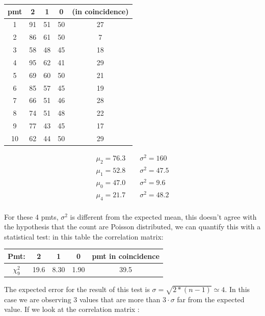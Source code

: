 \begin{center}
\begin{tabular}{c|c|c|c|c}
\hline 
pmt & 2 & 1 & 0 & (in coincidence) \\ 
\hline 
1 & 91 & 51 & 50 & 27 \\ 
\hline 
2 & 86 & 61 & 50 & 7 \\ 
\hline 
3 & 58 & 48 & 45 & 18 \\ 
\hline 
4 & 95 & 62 & 41 & 29 \\ 
\hline 
5 & 69 & 60 & 50 & 21 \\ 
\hline 
6 & 85 & 57 & 45 & 19 \\ 
\hline 
7 & 66 & 51 & 46 & 28 \\ 
\hline 
8 & 74 & 51 & 48 & 22 \\ 
\hline 
9 & 77 & 43 & 45 & 17 \\ 
\hline 
10 & 62 & 44 & 50 & 29 \\ 
\hline 
\end{tabular} 
\end{center}

\begin{equation*}
\begin{split}
\mu_{2} = 76.3 \qquad \sigma^{2} = 160  \\
\mu_{1} = 52.8 \qquad \sigma^{2} = 47.5 \\
\mu_{0} = 47.0 \qquad \sigma^{2} = 9.6  \\
\mu_{4} = 21.7 \qquad \sigma^{2} = 48.2 \\
\end{split}
\end{equation*}

For these 4 pmts, $\sigma^{2}$ is different from the expected mean, this doesn't agree with the hypothesis that the count are Poisson distributed, we can quantify this with a statistical test: in this table the correlation matrix:

\begingroup
\setlength{\tabcolsep}{8pt} %
\renewcommand{\arraystretch}{1.2} %
\begin{center}
\begin{tabular}{c|c|c|c|c}
\hline 
Pmt: & 2 & 1 & 0 & pmt in coincidence \\ 
\hline
$\chi^{2}_{9}$ & 19.6 & 8.30 & 1.90 & 39.5\\ 
\hline
\end{tabular} 
\end{center}
\endgroup
\smallskip

The expected error for the result of this test is $\sigma = \sqrt{2*(n-1)} \simeq 4$. In this case we are observing 3 values that are more than  $3 \cdot \sigma$ far from the expected value. If we look at the correlation matrix :


